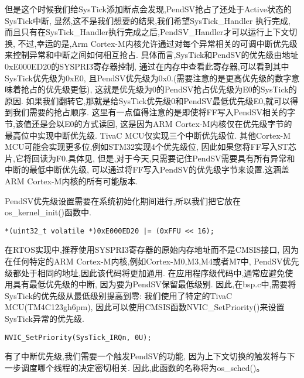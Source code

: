 但是这个时候我们给SysTick添加断点会发现,PendSV抢占了还处于Active状态的SysTick中断,
显然,这不是我们想要的结果,我们希望SysTick\_Handler 执行完成,
而且只有在SysTick\_Handler执行完成之后,PendSV\_Handler才可以运行上下文切换,
不过,幸运的是,Arm Cortex-M内核允许通过对每个异常相关的可调中断优先级来控制异常和中断之间如何相互抢占.
具体而言,SysTick和PendSV的优先级由地址0xE000ED20的SYSPRI3寄存器控制,
通过在内存中查看此寄存器,可以看到其中SysTick优先级为0xE0,
且PendSV优先级为0x0.(需要注意的是更高优先级的数字意味着抢占的优先级更低),
这就是优先级为0的PendSV抢占优先级为E0的SysTick的原因.
如果我们翻转它,那就是给SysTick优先级0和PendSV最低优先级E0,就可以得到我们需要的抢占顺序.
这里有一点值得注意的是即使将FF写入PendSV相关的字节,该值还是会以E0的方式读回,
这是因为ARM Cortex-M内核仅在优先级字节的最高位中实现中断优先级.
TivaC MCU仅实现三个中断优先级位.
其他Cortex-M MCU可能会实现更多位,例如STM32实现4个优先级位,
因此如果您将FF写入ST芯片,它将回读为F0.具体见\cite{interrupt_priority},
但是,对于今天,只需要记住PendSV需要具有所有异常和中断的最低中断优先级,
可以通过将FF写入PendSV的优先级字节来设置.这涵盖ARM Cortex-M内核的所有可能版本.

PendSV优先级设置需要在系统初始化期间进行,所以我们把它放在os\_kernel\_init()函数中.
\begin{lstlisting}[language={[ANSI]C},keywordstyle=\color{blue!70},commentstyle=\color{red!50!green!50!blue!50},frame=shadowbox, rulesepcolor=\color{red!20!green!20!blue!20}]
    *(uint32_t volatile *)0xE000ED20 |= (0xFFU << 16);
\end{lstlisting}
在RTOS实现中,推荐使用SYSPRI3寄存器的原始内存地址而不是CMSIS接口,
因为在任何特定的ARM Cortex-M内核,例如Cortex-M0,M3,M4或者M7中,
PendSV优先级都处于相同的地址,因此该代码将更加通用.
在应用程序级代码中,通常应避免使用具有最低优先级的中断,
因为要为PendSV保留最低级别.
因此,在bsp.c中,需要将SysTick的优先级从最低级别提高到零:
我们使用了特定的TivaC MCU(TM4C123gh6pm),
因此可以使用CMSIS函数NVIC\_SetPriority()来设置SysTick异常的优先级.
\begin{lstlisting}[language={[ANSI]C},keywordstyle=\color{blue!70},commentstyle=\color{red!50!green!50!blue!50},frame=shadowbox, rulesepcolor=\color{red!20!green!20!blue!20}]
    NVIC_SetPriority(SysTick_IRQn, 0U);
\end{lstlisting}

有了中断优先级,我们需要一个触发PendSV的功能,
因为上下文切换的触发将与下一步调度哪个线程的决定密切相关.
因此,此函数的名称将为os\_sched()。

